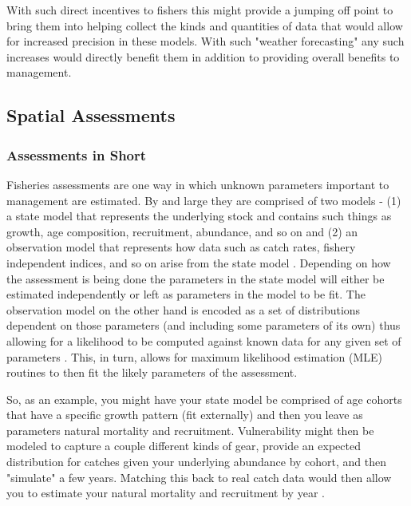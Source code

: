 \documentclass[11pt]{article}
\begin{document}
With such direct incentives to fishers this might provide a jumping off point to bring them into helping collect the kinds and quantities of data that would allow for increased precision in these models. With such "weather forecasting" any such increases would directly benefit them in addition to providing overall benefits to management. 

\newpage


\subsection{Spatial Assessments}

\subsubsection{Assessments in Short}

Fisheries assessments are one way in which unknown parameters important to management are estimated. By and large they are comprised of two models - (1) a state model that represents the underlying stock and contains such things as growth, age composition, recruitment, abundance, and so on and (2) an observation model that represents how data such as catch rates, fishery independent indices, and so on arise from the state model \cite{king}. Depending on how the assessment is being done the parameters in the state model will either be estimated independently or left as parameters in the model to be fit. The observation model on the other hand is encoded as a set of distributions dependent on those parameters (and including some parameters of its own) thus allowing for a likelihood to be computed against known data for any given set of parameters \cite{sippel2014}. This, in turn, allows for maximum likelihood estimation (MLE) routines to then fit the likely parameters of the assessment. \newline

So, as an example, you might have your state model be comprised of age cohorts that have a specific growth pattern (fit externally) and then you leave as parameters natural mortality and recruitment. Vulnerability might then be modeled to capture a couple different kinds of gear, provide an expected distribution for catches given your underlying abundance by cohort, and then "simulate" a few years. Matching this back to real catch data would then allow you to estimate your natural mortality and recruitment by year \cite{king} \cite{ASAP}. \newline
\end{document}
